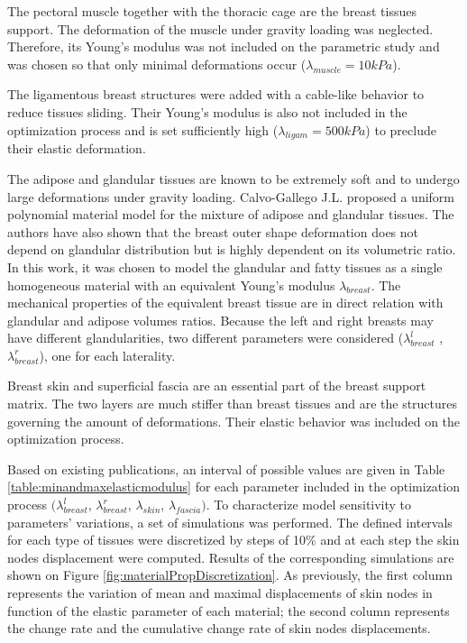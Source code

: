 The pectoral muscle together with the thoracic cage are the breast tissues support. The deformation of the muscle under gravity loading was neglected. Therefore, its Young's modulus was not included on the parametric study and was chosen so that only minimal deformations occur ($\lambda_{muscle}=10kPa$).

The ligamentous breast structures were added with a cable-like behavior to reduce tissues sliding. Their Young's modulus is also not included in the optimization process and is set sufficiently high ($\lambda_{ligam}=500kPa$) to preclude their elastic deformation. 

The adipose and glandular tissues are known to be extremely soft and to undergo large deformations under gravity loading. Calvo-Gallego J.L. \citep{calvo_polynomial_2015} proposed a uniform polynomial material model for the mixture of adipose and glandular tissues. The authors have also shown that the breast outer shape deformation does not depend on glandular distribution but is highly dependent on its volumetric ratio. In this work,  it was chosen to model the glandular and fatty tissues as a single homogeneous material with an equivalent Young's modulus $\lambda_{breast }$. The mechanical properties of the equivalent breast tissue are in direct relation with glandular and adipose volumes ratios. Because the left and right breasts may have different glandularities, two different parameters were considered ($\lambda_{breast}^l$ , $\lambda_{breast}^r$), one for each laterality.

Breast skin and superficial fascia are an essential part of the breast support matrix. The two layers are much stiffer than breast tissues and are the structures governing the amount of deformations. Their elastic behavior was included on the optimization process.

 Based on existing publications, an interval of possible values are given in Table \ref{table:minandmaxelasticmodulus} for each parameter included in the optimization process $(\lambda_{breast}^l$, $\lambda_{breast}^r$, $\lambda_{skin}$, $\lambda_{fascia})$. To characterize model sensitivity to parameters' variations, a set of simulations was performed. The defined intervals for each type of tissues were discretized by steps of 10\% and at each step the skin nodes displacement were computed. Results of the corresponding simulations are shown on Figure  \ref{fig:materialPropDiscretization}. As previously, the first column represents the variation of mean and maximal displacements of skin nodes in function of the elastic parameter of each material; the second column represents the change rate and the cumulative change rate of skin nodes displacements.


